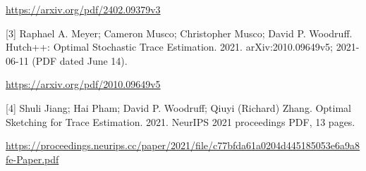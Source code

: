 \documentclass[10pt,a4paper]{article}
\begin{document}
\url{https://arxiv.org/pdf/2402.09379v3}

[3] Raphael A. Meyer; Cameron Musco; Christopher Musco; David P. Woodruff. Hutch++: Optimal Stochastic Trace Estimation. 2021. arXiv:2010.09649v5; 2021-06-11 (PDF dated June 14).

\url{https://arxiv.org/pdf/2010.09649v5}

[4] Shuli Jiang; Hai Pham; David P. Woodruff; Qiuyi (Richard) Zhang. Optimal Sketching for Trace Estimation. 2021. NeurIPS 2021 proceedings PDF, 13 pages.

\url{https://proceedings.neurips.cc/paper/2021/file/c77bfda61a0204d445185053e6a9a8fe-Paper.pdf}
\end{document}
